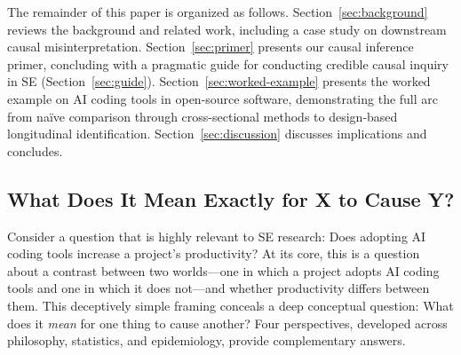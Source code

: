 The remainder of this paper is organized as follows.
Section~\ref{sec:background} reviews the background and related work, including a case study on downstream causal misinterpretation.
Section~\ref{sec:primer} presents our causal inference primer, concluding with a pragmatic guide for conducting credible causal inquiry in SE (Section~\ref{sec:guide}).
Section~\ref{sec:worked-example} presents the worked example on AI coding tools in open-source software, demonstrating the full arc from na\"ive comparison through cross-sectional methods to design-based longitudinal identification.
Section~\ref{sec:discussion} discusses implications and concludes.

\subsection{What Does It Mean Exactly for X to Cause Y?}
\label{sec:primer-causality}

Consider a question that is highly relevant to SE research: Does adopting AI coding tools increase a project's productivity?
At its core, this is a question about a contrast between two worlds---one in which a project adopts AI coding tools and one in which it does not---and whether productivity differs between them.
This deceptively simple framing conceals a deep conceptual question: What does it \emph{mean} for one thing to cause another?
Four perspectives, developed across philosophy, statistics, and epidemiology, provide complementary answers.

